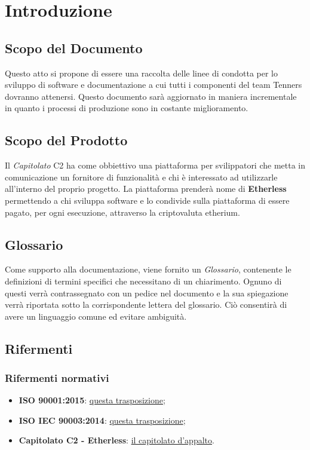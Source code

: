 \section{Introduzione}

\subsection{Scopo del Documento}
Questo atto si propone di essere una raccolta delle linee di condotta per lo
sviluppo di software e documentazione a cui tutti i componenti del team Tenners
dovranno attenersi.
Questo documento sar\`a aggiornato in maniera incrementale in quanto i processi
di produzione sono in costante miglioramento.

\subsection{Scopo del Prodotto}
Il \textit{Capitolato\glo} C2 ha come obbiettivo una piattaforma per svilippatori che metta
in comunicazione un fornitore di funzionalit\`a e chi \`e interessato ad utilizzarle
all'interno del proprio progetto.
La piattaforma prender\`a nome di \textbf{Etherless} permettendo a chi sviluppa software e
lo condivide sulla piattaforma di essere pagato, per ogni esecuzione, attraverso
la criptovaluta etherium.


\subsection{Glossario}
Come supporto alla documentazione, viene fornito un \textit{Glossario}\docs,
contenente le definizioni di termini specifici che necessitano di un chiarimento.
Ognuno di questi verr\`a contrassegnato con un pedice \glo nel documento e la sua
spiegazione verr\`a riportata sotto la corrispondente lettera del glossario. Ci\`o
consentir\`a di avere un linguaggio comune ed evitare ambiguit\`a.

\subsection{Rifermenti}
\subsubsection{Rifermenti normativi}
\begin{itemize}
  \item \textbf{ISO 90001:2015}: \href{https://www.praxiom.com/iso-9001.htm}{questa trasposizione};
  \item \textbf{ISO IEC 90003:2014}: \href{https://www.praxiom.com/iso-90003.htm}{questa trasposizione};
  \item \textbf{Capitolato C2 - Etherless}: \href{https://www.math.unipd.it/~tullio/IS-1/2019/Progetto/C2.pdf}{il capitolato d'appalto}.
\end{itemize}

